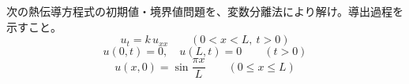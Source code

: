 
次の熱伝導方程式の初期値・境界値問題を、変数分離法により解け。導出過程を示すこと。
\[
u_t = k\,u_{xx} \qquad (0 < x < L,\ t > 0)
\]
\[
u(0,t) = 0,\quad u(L,t) = 0 \qquad (t > 0)
\]
\[
u(x,0) = \sin\frac{\pi x}{L} \qquad (0 \le x \le L)
\]
